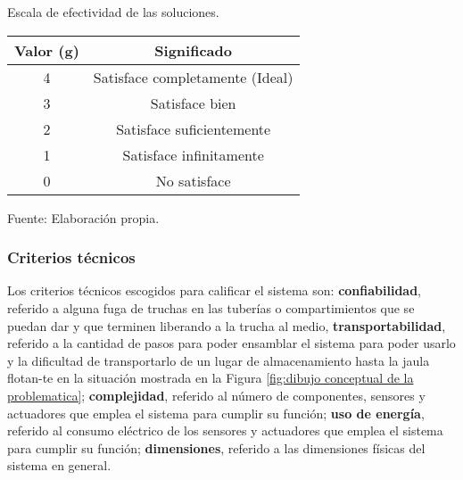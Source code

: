 \begin{mytable}[H]
	\footnotesize\centering
	\caption{Escala de efectividad de las soluciones.}
	\label{tab:escala de efectividad de las soluciones}
	\begin{tabular}{|c|c|}
		\hline
		\rowcolor[HTML]{D9D9D9} 
		\textbf{Valor (g)} & \textbf{Significado} 					\\ \hline
		4                  & Satisface completamente (Ideal)        \\ \hline
		3                  & Satisface bien           				\\ \hline
		2                  & Satisface suficientemente        		\\ \hline
		1                  & Satisface infinitamente     			\\ \hline
		0                  & No satisface				     		\\ \hline
	\end{tabular}
	\begin{myflushcenteraftertable}
		Fuente: Elaboración propia.
	\end{myflushcenteraftertable}
\end{mytable}


\subsubsection{Criterios técnicos}

Los criterios técnicos escogidos para calificar el sistema son: \textbf{confiabilidad}, referido a alguna fuga de truchas en las tuberías o compartimientos que se puedan dar y que terminen liberando a la trucha al medio, \textbf{transportabilidad}, referido a la cantidad de pasos para poder ensamblar el sistema para poder usarlo y la dificultad de transportarlo de un lugar de almacenamiento hasta la jaula flotan-te en la situación mostrada en la Figura \ref{fig:dibujo conceptual de la problematica}; \textbf{complejidad}, referido al número de componentes, sensores y actuadores que emplea el sistema para cumplir su función; \textbf{uso de energía}, referido al consumo eléctrico de los sensores y actuadores que emplea el sistema para cumplir su función; \textbf{dimensiones}, referido a las dimensiones físicas del sistema en general.


